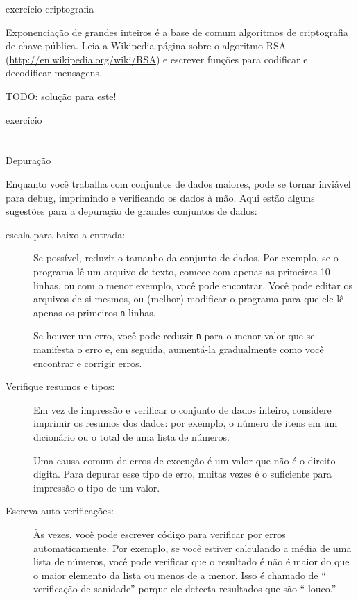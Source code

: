 \documentclass[10pt]{book}
\begin{document}
\begin{v erbatim}
\begin{} exercício
\index{} criptografia

Exponenciação de grandes inteiros é a base de comum
algoritmos de criptografia de chave pública. Leia a Wikipedia
página sobre o algoritmo RSA (\url{http://en.wikipedia.org/wiki/RSA})
e escrever funções para codificar e decodificar mensagens.

TODO: solução para este!

\end{} exercício


\section{} Depuração

Enquanto você trabalha com conjuntos de dados maiores, pode se tornar inviável para
debug, imprimindo e verificando os dados à mão. Aqui estão alguns
sugestões para a depuração de grandes conjuntos de dados:

\begin{description}

\item[escala para baixo a entrada:] Se possível, reduzir o tamanho da
conjunto de dados. Por exemplo, se o programa lê um arquivo de texto, comece com
apenas as primeiras 10 linhas, ou com o menor exemplo, você pode encontrar.
Você pode editar os arquivos de si mesmos, ou (melhor) modificar o
programa para que ele lê apenas os primeiros {\tt n} linhas.

Se houver um erro, você pode reduzir {\tt n} para o menor
valor que se manifesta o erro e, em seguida, aumentá-la gradualmente
como você encontrar e corrigir erros.

\item[Verifique resumos e tipos:] Em vez de impressão e verificar o
conjunto de dados inteiro, considere imprimir os resumos dos dados: por exemplo,
o número de itens em um dicionário ou o total de uma lista de números.

Uma causa comum de erros de execução é um valor que não é o direito
digita. Para depurar esse tipo de erro, muitas vezes é o suficiente para impressão
o tipo de um valor.

\item[Escreva auto-verificações:] Às vezes, você pode escrever código para verificar
por erros automaticamente. Por exemplo, se você estiver calculando a
média de uma lista de números, você pode verificar que o resultado é
não é maior do que o maior elemento da lista ou menos de
a menor. Isso é chamado de `` verificação de sanidade'' porque ele detecta
resultados que são `` louco.''


\end{description}
\end{v erbatim}
\end{document}
